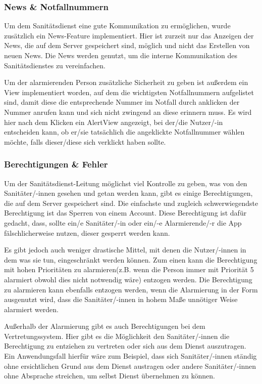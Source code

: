 \subsubsection{News \& Notfallnummern}
    Um dem Sanitätsdienst eine gute Kommunikation zu ermöglichen, wurde zusätzlich ein 
    News-Feature implementiert. Hier ist zurzeit nur das Anzeigen der News, die auf 
    dem Server gespeichert sind, möglich und nicht das Erstellen von neuen News. Die News 
    werden genutzt, um die interne Kommunikation des Sanitätsdienstes zu vereinfachen.

    Um der alarmierenden Person zusätzliche Sicherheit zu geben ist außerdem ein View 
    implementiert worden, auf dem die wichtigsten Notfallnummern aufgelistet sind,
    damit diese die entsprechende Nummer im Notfall durch anklicken der Nummer anrufen 
    kann und sich nicht zwingend an diese erinnern muss. Es wird hier nach dem Klicken 
    ein AlertView angezeigt, bei der/die Nutzer/-in entscheiden kann, ob er/sie tatsächlich die 
    angeklickte Notfallnummer wählen möchte, falls dieser/diese sich verklickt haben sollte.
    
\subsubsection{Berechtigungen \& Fehler}
    Um der Sanitätsdienst-Leitung möglichst viel Kontrolle zu geben, was von den 
    Sanitäter/-innen gesehen und getan werden kann, gibt es einige Berechtigungen, die 
    auf dem Server gespeichert sind. Die einfachste und zugleich schwerwiegendste 
    Berechtigung ist das Sperren von einem Account. Diese Berechtigung ist dafür 
    gedacht, dass, sollte ein/e Sanitäter/-in oder ein/-e Alarmierende/-r die App
    fälschlicherweise nutzen, dieser gesperrt werden kann.

    Es gibt jedoch auch weniger drastische Mittel, mit denen die Nutzer/-innen in dem was sie tun,
    eingeschränkt werden können. Zum einen kann die Berechtigung 
    mit hohen Prioritäten zu alarmieren(z.B. wenn die Person immer 
    mit Priorität 5 alarmiert obwohl dies nicht notwendig wäre) entzogen werden.  
    Die Berechtigung zu alarmieren kann ebenfalls entzogen werden, wenn die Alarmierung in der 
    Form ausgenutzt wird, dass die Sanitäter/-innen in hohem Maße unnötiger Weise alarmiert werden.

    Außerhalb der Alarmierung gibt es auch Berechtigungen bei dem Vertretungssystem. 
    Hier gibt es die Möglichkeit den Sanitäter/-innen die Berechtigung zu entziehen 
    zu vertreten oder sich aus dem Dienst auszutragen. Ein Anwendungsfall hierfür wäre 
    zum Beispiel, dass sich Sanitäter/-innen ständig ohne ersichtlichen Grund aus dem Dienst 
    austragen oder andere Sanitäter/-innen ohne Absprache streichen, um selbst Dienst übernehmen zu können.


